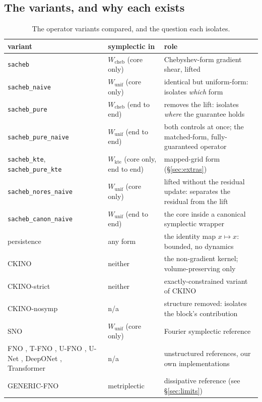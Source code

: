\documentclass[11pt]{article}
\theoremstyle{definition}
\theoremstyle{remark}
\newcommand{\Wc}{W_{\mathrm{cheb}}}
\newcommand{\Wu}{W_{\mathrm{unif}}}
\newcommand{\ckino}{\textsc{CKINO}}
\begin{document}
\subsection{The variants, and why each exists}

\begin{table}[htbp]
\centering
\caption{The operator variants compared, and the question each isolates.}
\label{tab:variants}
\small
\begin{tabular}{@{}p{33mm}lp{56mm}@{}}
\toprule
variant & symplectic in & role \\
\midrule
\texttt{sacheb} & $\Wc$ (core only) & Chebyshev-form gradient shear, lifted \\
\texttt{sacheb\_naive} & $\Wu$ (core only) & identical but uniform-form: isolates \emph{which} form \\
\texttt{sacheb\_pure} & $\Wc$ (end to end) & removes the lift: isolates \emph{where} the guarantee holds \\
\texttt{sacheb\_pure\_naive} & $\Wu$ (end to end) & both controls at once; the matched-form, fully-guaranteed operator \\
\texttt{sacheb\_kte}, \texttt{sacheb\_pure\_kte} & $W_{\mathrm{kte}}$ (core only, end to end) & mapped-grid form (\S\ref{sec:extras}) \\
\texttt{sacheb\_nores\_naive} & $\Wu$ (core only) & lifted without the residual update: separates the residual from the lift \\
\texttt{sacheb\_canon\_naive} & $\Wu$ (end to end) & the core inside a canonical symplectic wrapper \\
persistence & any form & the identity map $x\mapsto x$: bounded, no dynamics \\
\ckino{} & neither & the non-gradient kernel; volume-preserving only \\
\ckino{}-strict & neither & exactly-constrained variant of \ckino{} \\
\ckino{}-nosymp & n/a & structure removed: isolates the block's contribution \\
SNO \citep{makara2026sno} & $\Wu$ (core only) & Fourier symplectic reference \\
FNO \citep{li2021fno}, T-FNO \citep{kossaifi2023mgtfno}, U-FNO
\citep{wen2022ufno}, U-Net \citep{ronneberger2015unet}, DeepONet
\citep{lu2021deeponet}, Transformer \citep{vaswani2017attention} & n/a &
unstructured references, our own implementations \\
GENERIC-FNO \citep{sulskis2026generic} & metriplectic & dissipative reference (see \S\ref{sec:limits}) \\
\bottomrule
\end{tabular}
\end{table}
\end{document}
